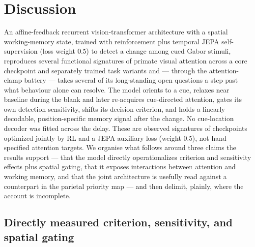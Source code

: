 
\section{Discussion}
\label{sec:discussion}

An affine-feedback recurrent vision-transformer architecture with a spatial
working-memory state, trained with reinforcement plus temporal JEPA self-supervision
(loss weight $0.5$) to detect a change among cued
Gabor stimuli, reproduces several functional signatures of primate visual attention
across a core checkpoint and separately trained task variants and --- through the attention-clamp battery --- takes several
of its long-standing open questions a step past what behaviour alone can
resolve. The model orients to a cue, relaxes near baseline during the blank and later
re-acquires cue-directed attention, gates its own detection sensitivity, shifts
its decision criterion, and holds a linearly decodable, position-specific memory signal
after the change. No cue-location decoder was fitted across the delay. These are
observed signatures of checkpoints optimized jointly by RL and a JEPA auxiliary loss
(weight $0.5$),
not hand-specified attention targets. We organise what follows around three claims the
results support --- that the model directly operationalizes criterion and sensitivity
effects plus spatial gating, that it exposes interactions between attention and working
memory, and that the joint architecture is usefully read against a
counterpart in the parietal priority map --- and then delimit, plainly,
where the account is incomplete.

\subsection*{Directly measured criterion, sensitivity, and spatial gating}

